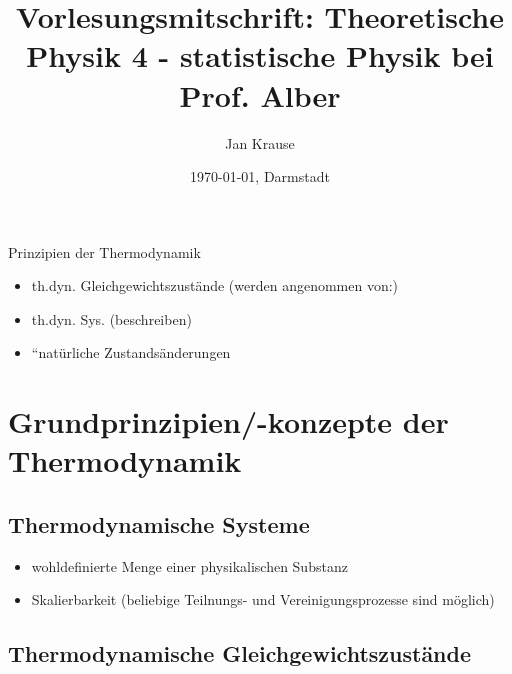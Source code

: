 \documentclass[11pt]{scrartcl} %
\title{Vorlesungsmitschrift: Theoretische Physik 4 - statistische Physik bei Prof. Alber}
\author{Jan Krause}
\date{\today{}, Darmstadt}
\begin{document}
\maketitle
\tableofcontents

 
 Prinzipien der Thermodynamik

 \begin{itemize}
  \item th.dyn. Gleichgewichtszustände (werden angenommen von:)
  \item th.dyn. Sys. (beschreiben)
  \item ``natürliche Zustandsänderungen
 \end{itemize}



 \section{Grundprinzipien/-konzepte der Thermodynamik}
 \label{sec:grundprinzipien}

 \subsection{Thermodynamische Systeme}
 \label{sec:grundprinzipien-thermodynamische-systeme}
 \begin{itemize}
  \item wohldefinierte Menge einer physikalischen Substanz
  \item Skalierbarkeit (beliebige Teilnungs- und Vereinigungsprozesse sind möglich)
 \end{itemize}
 
 \subsection{Thermodynamische Gleichgewichtszustände}
 \label{sec:grundprinzipien-thermodynmische-gleichgewichtszustaende}
 
 

  

 
 
 
 
 
 
 
 
 
 
 
 
 
 
 
 
 
 
 
 
 
 
 
 
\end{document}
